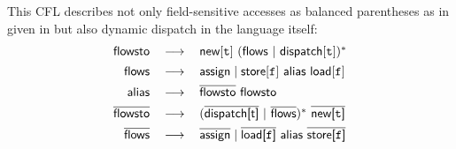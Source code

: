  
This CFL
describes not only field-sensitive accesses as balanced parentheses as in \manuLF given in  but also
dynamic dispatch in the language itself:
\begin{equation} 
\label{eqn:finalNewLF}
\begin{tabular}{rcl}
$\flowsto$ & $\longrightarrow$ & $\new[\texttt{t}]~(\flows~|~\indispatch[\texttt{t}])^*$ \\[1ex]
$\flows$ & $\longrightarrow$ & $\assign \mid \store[\texttt{f}] \ \alias \ \load[\texttt{f}]$\\[1ex] %
$\alias$ & $\longrightarrow$ & $\iflowsto ~ \flowsto$ \\[1ex]
$\iflowsto$ & $\longrightarrow$ & $(\iindispatchfield{t}~|~\iflows)^*~\inewfield{\texttt{t}}$ \\[1ex]
$\iflows$ & $\longrightarrow$ & $\iassign \mid \iloadfield{\texttt{f}} \ \alias \ \istorefield{\texttt{f}}$ \\[1ex] %
\end{tabular}
\end{equation}
